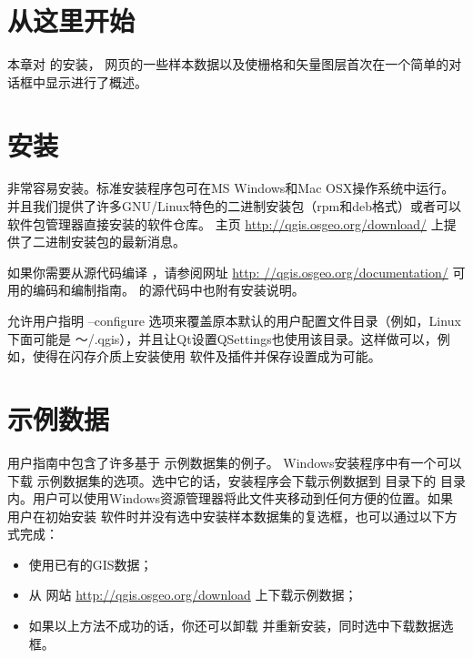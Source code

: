 
\section{从这里开始}\label{label_getstarted}


本章对 \qg 的安装， \qg 网页的一些样本数据以及使栅格和矢量图层首次在一个简单的对话框中显示进行了概述。

\section{安装}\label{label_installation}

\qg 非常容易安装。标准安装程序包可在MS Windows和Mac OSX操作系统中运行。并且我们提供了许多GNU/Linux特色的二进制安装包（rpm和deb格式）或者可以软件包管理器直接安装的软件仓库。 \qg 主页 \url{http://qgis.osgeo.org/download/} 上提供了二进制安装包的最新消息。


如果你需要从源代码编译 \qg ，请参阅网址 \url{http: //qgis.osgeo.org/documentation/} 可用的编码和编制指南。  \qg 的源代码中也附有安装说明。


\qg 允许用户指明 --configure 选项来覆盖原本默认的用户配置文件目录（例如，Linux下面可能是 ～/.qgis），并且让Qt设置QSettings也使用该目录。这样做可以，例如，使得在闪存介质上安装使用 \qg 软件及插件并保存设置成为可能。

\section{示例数据}\label{label_sampledata}

用户指南中包含了许多基于 \qg 示例数据集的例子。
\win Windows安装程序中有一个可以下载 \qg 示例数据集的选项。选中它的话，安装程序会下载示例数据到 目录下的 目录内。用户可以使用Windows资源管理器将此文件夹移动到任何方便的位置。如果用户在初始安装 \qg 软件时并没有选中安装样本数据集的复选框，也可以通过以下方式完成：

\begin{itemize}[label=--]
\item 使用已有的GIS数据；
\item 从 \qg 网站 \url{http://qgis.osgeo.org/download} 上下载示例数据； 
\item 如果以上方法不成功的话，你还可以卸载 \qg 并重新安装，同时选中下载数据选框。
\end{itemize}

